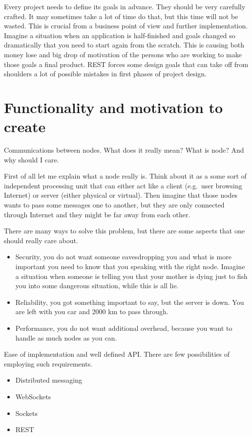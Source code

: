 Every project needs to define its goals in advance. They should be very
carefully crafted. It may sometimes take a lot of time do that, but this time
will not be wasted. This is crucial from a business point of view and further
implementation. Imagine a situation when an application is half-finished and
goals changed so dramatically that you need to start again from the scratch.
This is causing both money lose and big drop of motivation of the persons who
are working to make those goals a final product. REST forces some design goals
that can take off from shoulders a lot of possible mistakes in first phases of
project design.

\section{Functionality and motivation to create}
Communications between nodes. What does it really mean? What is node? And why
should I care.

First of all let me explain what a node really is. Think about it as a some
sort of independent processing unit that can either act like a client (e.g.\
user browsing Internet) or server (either physical or virtual). Then imagine
that those nodes wants to pass some messages one to another, but they are only
connected through Internet and they might be far away from each other.

There are many ways to solve this problem, but there are some aspects that one
should really care about.


\begin{itemize}
\item Security, you do not want someone eavesdropping you and what is more
  important you need to know that you speaking with the right node. Imagine a
  situation when someone is telling you that your mother is dying just to fish
  you into some dangerous situation, while this is all lie.

\item Reliability, you got something important to say, but the server is down.
  You are left with you car and 2000 km to pass through.

\item Performance, you do not want additional overhead, because you want to
  handle as much nodes as you can.
\end{itemize}

Ease of implementation and well defined API\@. There are few possibilities of
employing such requirements.
\begin{itemize}
\item Distributed messaging
\item WebSockets
\item Sockets
\item REST
\end{itemize}

